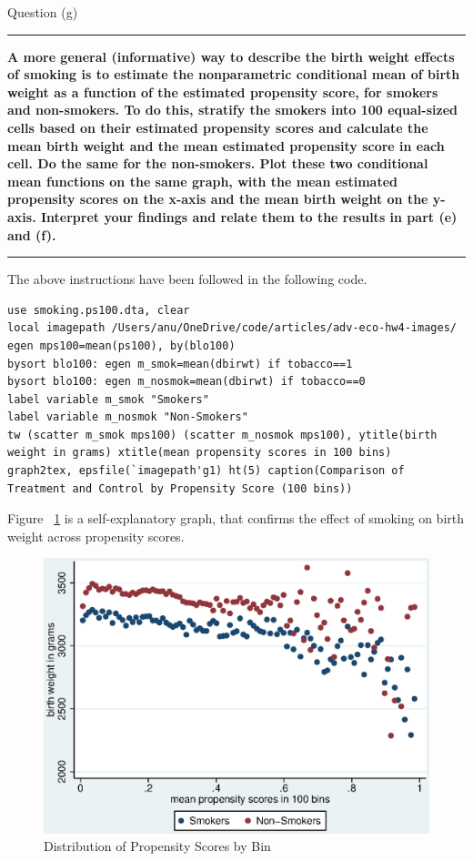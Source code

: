 \documentclass[12pt]{article}
\newcommand\question[1]{\vspace{1em}\hrule\vspace{1em}\textbf{#1}\vspace{1em}\hrule\vspace{1em}}
\begin{document}
\newpage
\begin{center}\LARGE{Question (g)}\end{center}
\question{A more general (informative) way to describe the birth weight effects of smoking is to estimate the nonparametric conditional mean of birth weight as a function of the estimated propensity score, for smokers and non-smokers.  To do this, stratify the smokers into 100 equal-sized cells based on their estimated propensity scores and calculate the mean birth weight and the mean estimated propensity score in each cell.  Do the same for the non-smokers.  Plot these two conditional mean functions on the same graph, with the mean estimated propensity scores on the x-axis and the mean birth weight on the y-axis.  Interpret your findings and relate them to the results in part (e) and (f).}

The above instructions have been followed in the following code.\\

\begin{lstlisting}
use smoking.ps100.dta, clear
local imagepath /Users/anu/OneDrive/code/articles/adv-eco-hw4-images/
egen mps100=mean(ps100), by(blo100)
bysort blo100: egen m_smok=mean(dbirwt) if tobacco==1
bysort blo100: egen m_nosmok=mean(dbirwt) if tobacco==0
label variable m_smok "Smokers"
label variable m_nosmok "Non-Smokers"
tw (scatter m_smok mps100) (scatter m_nosmok mps100), ytitle(birth weight in grams) xtitle(mean propensity scores in 100 bins)
graph2tex, epsfile(`imagepath'g1) ht(5) caption(Comparison of Treatment and Control by Propensity Score (100 bins))
\end{lstlisting}

Figure ~\ref{g1} is a self-explanatory graph, that confirms the effect of smoking on birth weight across propensity scores.

\begin{figure}[h]
\begin{centering}
  \includegraphics[width=\textwidth]{g1}
  \caption{Distribution of Propensity Scores by Bin}
  \label{g1}
\end{centering}
\end{figure}
\end{document}
